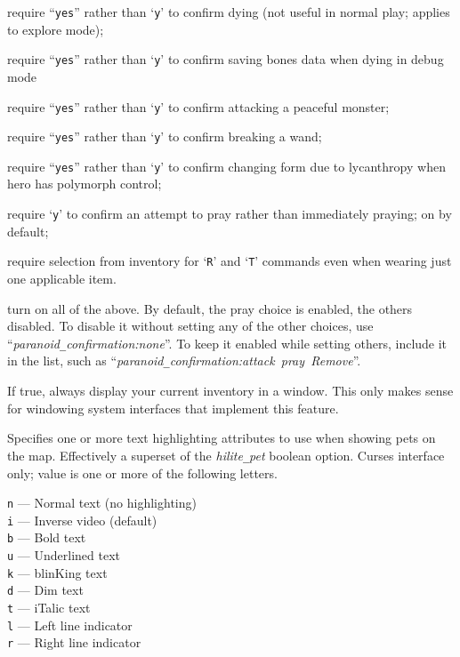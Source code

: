 \item[{\tt die~~~~}]
require ``{\tt yes}'' rather than `{\tt y}' to confirm dying (not
useful in normal play; applies to explore mode);
\item[{\tt bones~~}]
require ``{\tt yes}'' rather than `{\tt y}' to confirm saving
bones data when dying in debug mode
\item[{\tt attack~}]
require ``{\tt yes}'' rather than `{\tt y}' to confirm attacking
a peaceful monster;
\item[{\tt wand-break}]
require ``{\tt yes}'' rather than `{\tt y}' to confirm breaking
a wand;
\item[{\tt Were-change}]
require ``{\tt yes}'' rather than `{\tt y}' to confirm changing form
due to lycanthropy
when hero has polymorph control;
\item[{\tt pray~~~}]
require `{\tt y}' to confirm an attempt to pray rather
than immediately praying; on by default;
\item[{\tt Remove~}] require selection from inventory for `{\tt R}'
and `{\tt T}'
commands even when wearing just one applicable item.
\item[{\tt all~~~~}]
turn on all of the above.
\elist
By default, the pray choice is enabled, the others disabled.
To disable it without setting
any of the other choices, use ``{\it paranoid\verb+_+confirmation:none}''.  To keep
it enabled while setting others, include it in the list,
such as ``{\it par\-a\-noid\verb+_+con\-fir\-ma\-tion:attack~pray~Remove}''.
\item[\ib{perm\verb+_+invent}]
If true, always display your current inventory in a window.  This only
makes sense for windowing system interfaces that implement this feature.
\item[\ib{petattr}]
Specifies one or more text highlighting attributes to use when showing
pets on the map.
Effectively a superset of the {\it hilite\verb+_+pet\/} boolean option.
Curses interface only; value is one or more of the following letters.

{\tt n} --- Normal text (no highlighting)\\
{\tt i} --- Inverse video (default)\\
{\tt b} --- Bold text\\
{\tt u} --- Underlined text\\
{\tt k} --- blinKing text\\
{\tt d} --- Dim text\\
{\tt t} --- iTalic text\\
{\tt l} --- Left line indicator\\
{\tt r} --- Right line indicator\\

